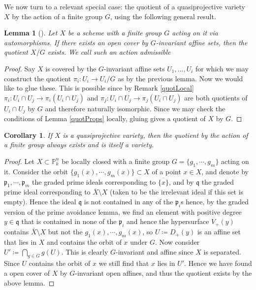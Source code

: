 \documentclass[11pt, a4paper, english, twoside]{article}
\theoremstyle{plain}
\newtheorem{corollary}[theorem]{Corollary}
\newtheorem{lemma}[theorem]{Lemma}
\theoremstyle{definition}
\begin{document}
We now turn to a relevant special case: the quotient of a quasiprojective variety $X$ by the action of a finite group $G$, using the following
general result.

\begin{lemma}[{\cite[Prop. 1.8]{SGA1}}]    
    Let $X$ be a scheme with a finite group $G$ acting on it via automorphisms. If there exists an open cover by $G$-invariant affine sets,
    then the quotient $X/G$ exists.
    We call such an action \emph{admissible}
\end{lemma}
\begin{proof}
    Say $X$ is covered by the $G$-invariant affine sets $U_1,\dots,U_i$ for which we may construct the quotient $\pi_i \colon U_i \to U_i/G$ 
    as by the previous lemma. Now we would like to glue these. This is possible since by Remark \ref{quotLocal} 
$\pi_i \colon U_i \cap U_j \to \pi_i(U_i \cap U_j)$ and $\pi_j \colon U_i \cap U_j \to \pi_j(U_i \cap U_j)$ are both quotients of $U_i \cap U_j$
    by $G$ and therefore naturally isomorphic. Since we may check the conditions of Lemma \ref{quotProps} locally, gluing gives a quotient of 
    $X$ by $G$.
\end{proof}

\begin{corollary}
    If $X$ is a quasiprojective variety, then the quotient by the action of a finite group always exists and is itself a variety.
\end{corollary}
\begin{proof}
    Let $X \subset \mathbb{P}_k^n$ be locally closed with a finite group $G = \{g_1,\cdots,g_m\}$ acting on it. 
    Consider the orbit $\{g_1(x),\cdots,g_m(x)\} \subset X$ of a point $x \in X$, and denote by $\mathfrak{p}_1,\cdots,\mathfrak{p}_m$ the 
    graded prime ideals corresponding to $\overline{\{x\}}$, and by $\mathfrak{q}$ the graded prime ideal corresponding to
    $\overline{X} \setminus X$ (taken to be the irrelevant ideal if this set is empty). 
    Hence the ideal $\mathfrak{q}$ is not contained in any of the $\mathfrak{p}_i$s hence, by the graded version of the prime
    avoidance lemma, we find an element with positive degree $y \in \mathfrak{q}$ that is contained in none of the $\mathfrak{p}_i$ and hence
    the hypersurface $V_+(y)$ contains $\bar{X} \setminus X$ but not the $g_1(x),\cdots,g_m(x)$, so $U \coloneqq D_+(y)$ 
    is an affine set that lies in $X$ and contains the orbit of $x$ under $G$. Now consider $U' \coloneqq \bigcap_{g \in G} g(U)$. 
    This is clearly $G$-invariant and affine since $X$ is separated. 
    Since $U$ contains the orbit of $x$ we still find that $x$ lies in $U'$. Hence we have found a open cover of $X$ by
    $G$-invariant open affines, and thus the quotient exists by the above lemma.
\end{proof}
\end{document}
